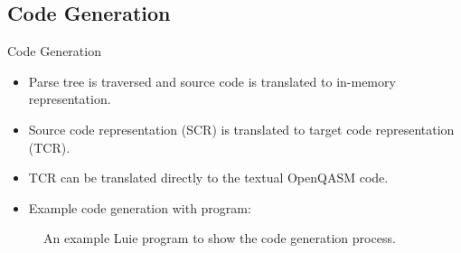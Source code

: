 
\subsection{Code Generation}
\begin{frame}{Code Generation}
    \begin{itemize}
        \item Parse tree is traversed and source code is translated to in-memory representation.
        \item Source code representation (SCR) is translated to target code representation (TCR).
        \item TCR can be translated directly to the textual OpenQASM code.
        \item Example code generation with program:
    \end{itemize}
    \begin{figure}
        \centering
        
        \caption{An example Luie program to show the code generation process.}
    \end{figure}
\end{frame}


